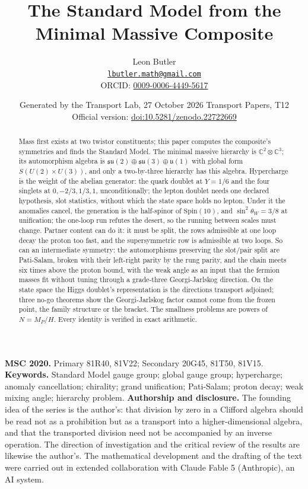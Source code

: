\documentclass[11pt]{article}
\title{\bfseries The Standard Model from the Minimal Massive Composite}
\author{Leon Butler\\ \normalsize\href{mailto:lbutler.math@gmail.com}{\texttt{lbutler.math@gmail.com}}\\ \normalsize ORCID: \href{https://orcid.org/0009-0006-4449-5617}{0009-0006-4449-5617}}
\date{Generated by the Transport Lab, 27 October 2026 \textperiodcentered{} Transport Papers, T12\\[3pt]\small Official version: \href{https://doi.org/10.5281/zenodo.22722669}{doi:10.5281/zenodo.22722669}}
\theoremstyle{definition}
\theoremstyle{plain}
\providecommand{\C}{}\renewcommand{\C}{\mathbb{C}}
\providecommand{\su}{}\renewcommand{\su}{\mathfrak{su}}
\providecommand{\uu}{}\renewcommand{\uu}{\mathfrak{u}}
\begin{document}
\maketitle
\begin{abstract}
\normalsize
Mass first exists at two twistor constituents; this paper computes the composite's symmetries and finds the Standard Model. The minimal massive hierarchy is $\C^{2} \otimes \C^{3}$; its automorphism algebra is $\su(2) \oplus \su(3) \oplus \uu(1)$ with global form $S(U(2) \times U(3))$, and only a two-by-three hierarchy has this algebra. Hypercharge is the weight of the abelian generator: the quark doublet at $Y = 1/6$ and the four singlets at $0, -2/3, 1/3, 1$, unconditionally; the lepton doublet needs one declared hypothesis, slot statistics, without which the state space holds no lepton. Under it the anomalies cancel, the generation is the half-spinor of $\mathrm{Spin}(10)$, and $\sin^{2}\theta_{W} = 3/8$ at unification; the one-loop run refutes the desert, so the running between scales must change. Partner content can do it: it must be split, the rows admissible at one loop decay the proton too fast, and the supersymmetric row is admissible at two loops. So can an intermediate symmetry: the automorphisms preserving the slot/pair split are Pati-Salam, broken with their left-right parity by the rung parity, and the chain meets six times above the proton bound, with the weak angle as an input that the fermion masses fit without tuning through a grade-three Georgi-Jarlskog direction. On the state space the Higgs doublet's representation is the directions transport adjoined; three no-go theorems show the Georgi-Jarlskog factor cannot come from the frozen point, the family structure or the bracket. The smallness problems are powers of $N = M_{P}/H$. Every identity is verified in exact arithmetic.
\end{abstract}
\medskip
\noindent\textbf{MSC 2020.} Primary 81R40, 81V22; Secondary 20G45, 81T50, 81V15.\\
\textbf{Keywords.} Standard Model gauge group; global gauge group; hypercharge; anomaly cancellation; chirality; grand unification; Pati-Salam; proton decay; weak mixing angle; hierarchy problem.
\newpage
\noindent \textbf{Authorship and disclosure. }The founding idea of the series is the author's: that division by zero in a Clifford algebra should be read not as a prohibition but as a transport into a higher-dimensional algebra, and that the transported division need not be accompanied by an inverse operation. The direction of investigation and the critical review of the results are likewise the author's. The mathematical development and the drafting of the text were carried out in extended collaboration with Claude Fable 5 (Anthropic), an AI system.
\end{document}
